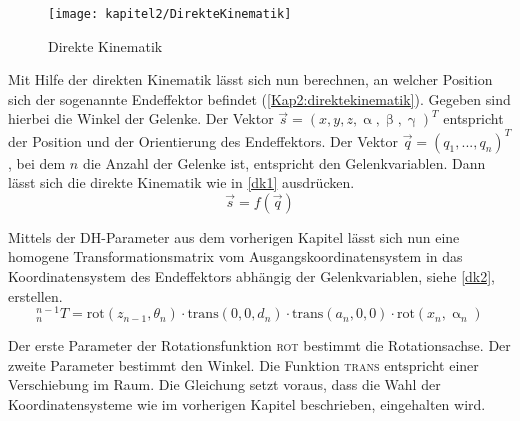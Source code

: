 \begin{figure}[b!]
  \centering
  \texttt{[image: kapitel2/DirekteKinematik]}
  \caption{Direkte Kinematik}
  \label{Kap2:direktekinematik}
\end{figure}

Mit Hilfe der direkten Kinematik lässt sich nun berechnen, an welcher Position sich der sogenannte Endeffektor befindet (\autoref{Kap2:direktekinematik}). Gegeben sind hierbei die Winkel der Gelenke. Der Vektor $ \vec{s} = (x,y,z,\upalpha,\upbeta,\upgamma)^T $  entspricht der Position und der Orientierung des Endeffektors. Der Vektor $ \vec{q} = (q_1, ...,q_n)^T $, bei dem $n$ die Anzahl der Gelenke ist, entspricht den Gelenkvariablen. Dann lässt sich die direkte Kinematik wie in \autoref{dk1} ausdrücken.
\begin{equation}
  \vec{s} = f(\vec{q})
\label{dk1}
\end{equation}

Mittels der DH-Parameter aus dem vorherigen Kapitel lässt sich nun eine homogene Transformationsmatrix vom Ausgangskoordinatensystem in das Koordinatensystem des Endeffektors abhängig der Gelenkvariablen, siehe \autoref{dk2}, erstellen.
\begin{equation}
  ^{n-1}_{n}T = \textrm{rot}(z_{n-1},\theta_n) \cdot \textrm{trans}(0,0,d_{n}) \cdot \textrm{trans}(a_{n},0,0) \cdot \textrm{rot}(x_{n},\upalpha_{n})
\label{dk2}
\end{equation}

Der erste Parameter der Rotationsfunktion \textsc{rot} bestimmt die Rotationsachse. Der zweite Parameter bestimmt den Winkel. Die Funktion \textsc{trans} entspricht einer Verschiebung im Raum. Die Gleichung setzt voraus, dass die Wahl der Koordinatensysteme wie im vorherigen Kapitel beschrieben, eingehalten wird.

